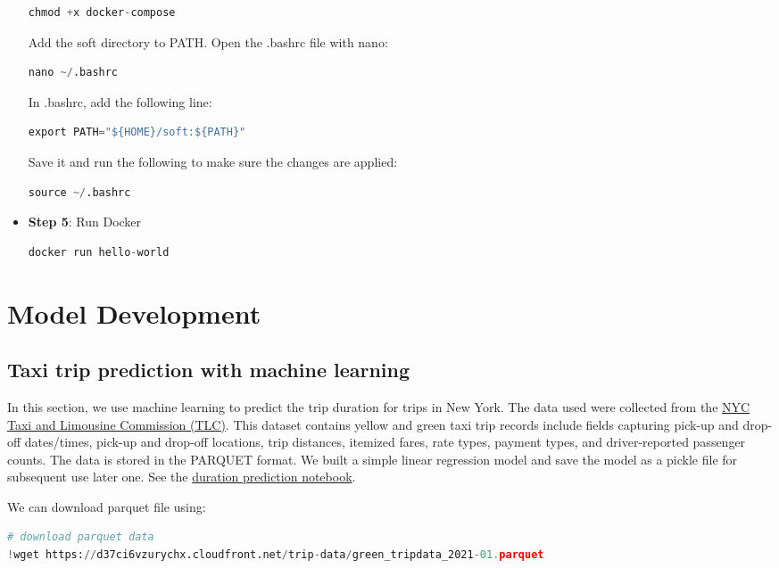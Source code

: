 \documentclass[letterpaper,12pt,notitlepage,twoside]{report}
\begin{document}
\begin{itemize}
\begin{lstlisting}[language=python, numbers=none]
chmod +x docker-compose
\end{lstlisting}
Add the soft directory to PATH. Open the .bashrc file with nano:
\begin{lstlisting}[language=python, numbers=none]
nano ~/.bashrc
\end{lstlisting}
In .bashrc, add the following line:
\begin{lstlisting}[language=python, numbers=none]
export PATH="${HOME}/soft:${PATH}"
\end{lstlisting}
Save it and run the following to make sure the changes are applied:
\begin{lstlisting}[language=python, numbers=none]
source ~/.bashrc
\end{lstlisting}
\item \textbf{Step 5}: Run Docker
\begin{lstlisting}[language=python, numbers=none]
docker run hello-world
\end{lstlisting}
\end{itemize}

\section{Model Development}
\subsection{Taxi trip prediction with machine learning}
    \begin{example}[frametitle=\extitle{TLC Trip Prediction}]
      In this section, we use machine learning to predict the trip duration for trips in New York. The data used were collected from the \href{https://www.nyc.gov/site/tlc/about/tlc-trip-record-data.page}{NYC Taxi and Limousine Commission (TLC)}. This dataset contains yellow and green taxi trip records include fields capturing pick-up and drop-off dates/times, pick-up and drop-off locations, trip distances, itemized fares, rate types, payment types, and driver-reported passenger counts. The data is stored in the PARQUET format.  We built a simple linear regression model and save the model as a pickle file for subsequent use later one.  See the \href{https://github.com/chuksoo/mlops-zoomcamp-2024/blob/main/01%20-%20Intro/duration-prediction.ipynb}{duration prediction notebook}.
    \end{example}

We can download parquet file using:
\begin{lstlisting}[language=python, numbers=none]
# download parquet data
!wget https://d37ci6vzurychx.cloudfront.net/trip-data/green_tripdata_2021-01.parquet
\end{lstlisting}
\end{document}
